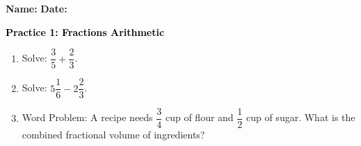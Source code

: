 \documentclass[12pt, letterpaper, fleqn]{article}
\begin{document}
\textbf{Name:} \underline{\hspace{5cm}}
\hfill
\textbf{Date:} \underline{\hspace{3cm}}\\

\begin{tcolorbox}[colback=customteal!20]
    \large\textcolor{black}{\textbf{Practice 1: Fractions Arithmetic}}
\end{tcolorbox}
\begin{enumerate}[itemsep=3.5cm, leftmargin=0.6cm]
\item Solve: $\dfrac{3}{5} + \dfrac{2}{3}$.
\vspace{3.5cm}
\item Solve: $5\dfrac{1}{6} - 2\dfrac{2}{3}$.
\vspace{3.5cm}
\item Word Problem: A recipe needs $\dfrac{3}{4}$ cup of flour and $\dfrac{1}{2}$ cup of sugar. What is the combined fractional volume of ingredients?
\end{enumerate}
\end{document}
